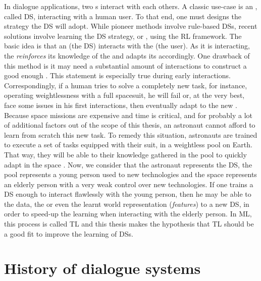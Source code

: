 In dialogue applications, two s interact with each others.
A classic use-case is an , called \gls{DS}, interacting with a human user.
To that end, one must designs the strategy the \gls{DS} will adopt. While pioneer methods involve rule-based \glspl{DS}, recent solutions involve learning the \gls{DS} strategy, or \textit{}, using the \gls{RL} framework.
The basic idea is that an \textit{} (the \gls{DS}) interacts with the \textit{} (the user).
As it is interacting, the  \textit{reinforces} its knowledge of the  and adapts its  accordingly.
One drawback of this method is it may need a substantial amount of interactions to construct a good enough .
This statement is especially true during early interactions. Correspondingly, if a human tries to solve a completely new task, for instance, operating weightlessness with a full spacesuit, he will fail or, at the very best, face some issues in his first interactions, then eventually adapt to the new . Because space missions are expensive and time is critical, and for probably a lot of additional factors out of the scope of this thesis, an astronaut cannot afford to learn from scratch this new task.
%
To remedy this situation, astronauts are trained to execute a set of tasks equipped with their suit, in a weightless pool on Earth. That way, they will be able to \textit{} their knowledge gathered in the pool  to quickly adapt in the space . Now, we consider that the astronaut represents the \gls{DS}, the pool  represents a young person used to new technologies and the space  represents an elderly person with a very weak control over new technologies. If one trains a \gls{DS} enough to interact flawlessly with the young person, then he may be able to  the data, the  or even the learnt world representation (\textit{features}) to a new \gls{DS}, in order to speed-up the learning when interacting with the elderly person. In \gls{ML}, this process is called \gls{TL} and this thesis makes the hypothesis that \gls{TL} should be a good fit to improve the learning of \glspl{DS}.


\section{History of dialogue systems}

